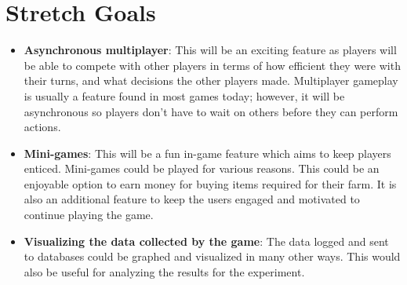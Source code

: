 \documentclass{article}
\begin{document}
\section{Stretch Goals}
    \begin{itemize}
        \item \textbf{Asynchronous multiplayer}: This will be an exciting feature as players will be able to compete with other players in terms of how efficient they were with their turns, and what decisions the other players made. Multiplayer gameplay is usually a feature found in most games today; however, it will be asynchronous so players don't have to wait on others before they can perform actions.
        \item \textbf{Mini-games}: This will be a fun in-game feature which aims to keep players enticed. Mini-games could be played for various reasons. This could be an enjoyable option to earn money for buying items required for their farm. It is also an additional feature to keep the users engaged and motivated to continue playing the game.
        \item \textbf{Visualizing the data collected by the game}: The data logged and sent to databases could be graphed and visualized in many other ways. This would also be useful for analyzing the results for the experiment.
    \end{itemize}
\end{document}
